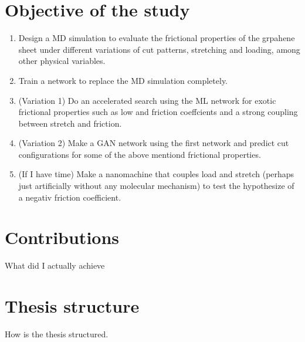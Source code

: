 
%
\section{Objective of the study}

\begin{enumerate}
    \item Design a MD simulation to evaluate the frictional properties of the grpahene sheet under different variations of cut patterns, stretching and loading, among other physical variables.
    \item Train a network to replace the MD simulation completely.
    \item (Variation 1) Do an accelerated search using the ML network for exotic frictional properties such as low and friction coeffcients and a strong coupling between stretch and friction. 
    \item (Variation 2) Make a GAN network using the first network and predict cut configurations for some of the above mentiond frictional properties.
    \item (If I have time) Make a nanomachine that couples load and stretch (perhaps just artificially without any molecular mechanism) to test the hypothesize of a negativ friction coefficient. 
\end{enumerate}


\section{Contributions}

What did I actually achieve

\section{Thesis structure}

How is the thesis structured.





